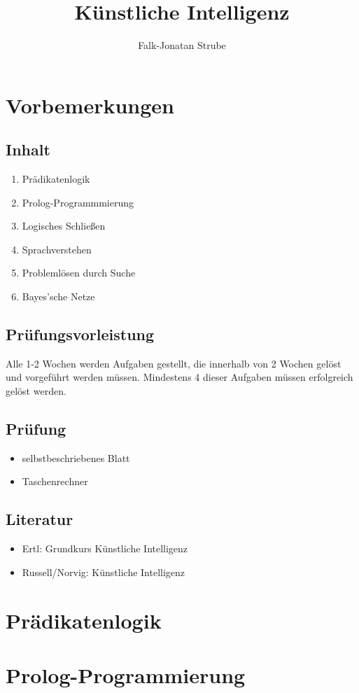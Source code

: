 \documentclass{scrreprt}
\title{Künstliche Intelligenz}
\author{Falk-Jonatan Strube}
\begin{document}
\maketitle
\tableofcontents

\chapter*{Vorbemerkungen}
\section*{Inhalt}
\begin{enumerate}
\item Prädikatenlogik
\item Prolog-Programmmierung
\item Logisches Schließen
\item Sprachverstehen
\item Problemlösen durch Suche
\item Bayes'sche Netze
\end{enumerate}

\section*{Prüfungsvorleistung}
Alle 1-2 Wochen werden Aufgaben gestellt, die innerhalb von 2 Wochen gelöst und vorgeführt werden müssen. Mindestens 4 dieser Aufgaben müssen erfolgreich gelöst werden.

\section*{Prüfung}
\begin{itemize}
\item selbstbeschriebenes Blatt
\item Taschenrechner
\end{itemize}

\section*{Literatur}
\begin{itemize}
\item Ertl: Grundkurs Künstliche Intelligenz
\item Russell/Norvig: Künstliche Intelligenz
\end{itemize}

\chapter{Prädikatenlogik}


\chapter{Prolog-Programmierung}



\end{document}

